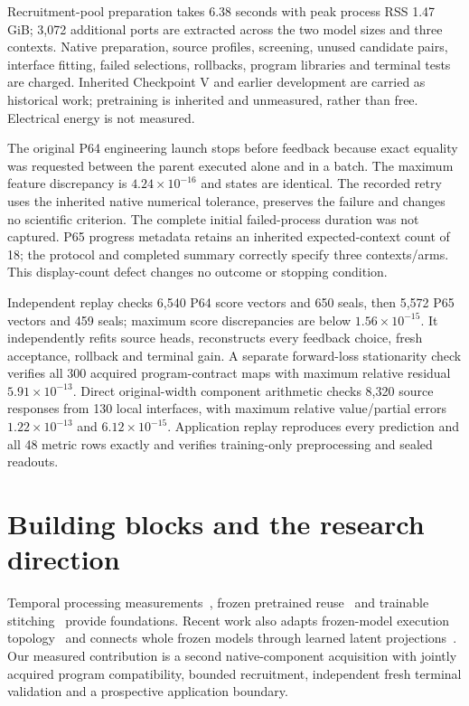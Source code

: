 \documentclass[11pt]{article}
\begin{document}
Recruitment-pool preparation takes 6.38 seconds with peak process RSS 1.47 GiB; 3,072 additional ports are extracted across the two model sizes and three contexts. Native preparation, source profiles, screening, unused candidate pairs, interface fitting, failed selections, rollbacks, program libraries and terminal tests are charged. Inherited Checkpoint V and earlier development are carried as historical work; pretraining is inherited and unmeasured, rather than free. Electrical energy is not measured.

The original P64 engineering launch stops before feedback because exact equality was requested between the parent executed alone and in a batch. The maximum feature discrepancy is $4.24\times10^{-16}$ and states are identical. The recorded retry uses the inherited native numerical tolerance, preserves the failure and changes no scientific criterion. The complete initial failed-process duration was not captured. P65 progress metadata retains an inherited expected-context count of 18; the protocol and completed summary correctly specify three contexts/arms. This display-count defect changes no outcome or stopping condition.

Independent replay checks 6,540 P64 score vectors and 650 seals, then 5,572 P65 vectors and 459 seals; maximum score discrepancies are below $1.56\times10^{-15}$. It independently refits source heads, reconstructs every feedback choice, fresh acceptance, rollback and terminal gain. A separate forward-loss stationarity check verifies all 300 acquired program-contract maps with maximum relative residual $5.91\times10^{-13}$. Direct original-width component arithmetic checks 8,320 source responses from 130 local interfaces, with maximum relative value/partial errors $1.22\times10^{-13}$ and $6.12\times10^{-15}$. Application replay reproduces every prediction and all 48 metric rows exactly and verifies training-only preprocessing and sealed readouts.

\section{Building blocks and the research direction}
Temporal processing measurements~\cite{dambre}, frozen pretrained reuse~\cite{lu} and trainable stitching~\cite{stitch} provide foundations. Recent work also adapts frozen-model execution topology~\cite{selfmorph} and connects whole frozen models through learned latent projections~\cite{deadweights}. Our measured contribution is a second native-component acquisition with jointly acquired program compatibility, bounded recruitment, independent fresh terminal validation and a prospective application boundary.
\end{document}

